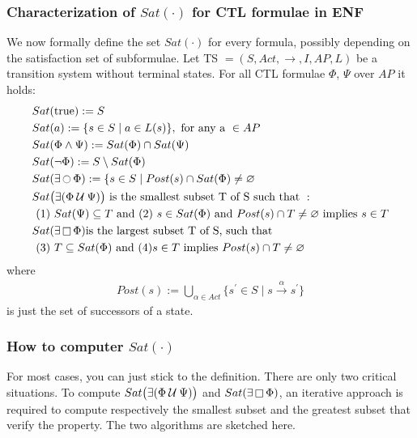 \documentclass{article}
\begin{document}
\subsubsection*{Characterization of $Sat(\cdot)$ for CTL formulae in ENF}
We now formally define the set $Sat(\cdot)$ for every formula, possibly depending on the satisfaction set of subformulae. Let TS $ = (S, Act, \rightarrow, I, AP, L)$ be a transition system without terminal states. For all CTL formulae $\Phi$, $\Psi$ over $AP$ it holds:
\begin{align*}
    & Sat(\text{true}) := S \\
    & Sat(a) := \{ s \in S \mid a \in L(s) \}, \text{ for any a } \in AP \\ 
    & Sat( \Phi \land \Psi) := Sat(\Phi) \cap Sat(\Psi) \\ 
    & Sat(\neg \Phi) := S \setminus Sat(\Phi) \\ 
    & Sat(\exists \mathop{\ocircle}{\Phi}) := \{ s \in S \mid Post(s) \cap Sat(\Phi) \neq \varnothing \\
    & Sat\big(\exists (\Phi \mathbin{\mathcal{U}} \Psi) \big) \text{ is the smallest subset T of S such that }: \\
    & \text{   (1)   } Sat(\Psi) \subseteq T \text{ and (2) } s \in Sat(\Phi) \text{ and } Post(s) \cap T \neq \varnothing \text{ implies } s \in T \\
    & Sat(\exists \mathop{\square} \Phi) \text{is the largest subset T of S, such that }\\
    & \text{   (3)   } T \subseteq Sat(\Phi) \text{ and } (4) s \in T \text{ implies } Post(s) \cap T \neq \varnothing \\
\end{align*}
where
\begin{align*}
    Post(s) := \bigcup_{\alpha \in Act} \{ s^{'} \in S \mid s \xrightarrow{\alpha} s^{'} \}
\end{align*}
is just the set of successors of a state.

\subsubsection{How to computer $Sat(\cdot)$}
For most cases, you can just stick to the definition. There are only two critical situations.
To compute $Sat\big(\exists (\Phi \mathbin{\mathcal{U}} \Psi) \big)$ and $Sat(\exists \mathop{\square} \Phi)$, an iterative approach is required to compute respectively the smallest subset and the greatest subset that verify the property. The two algorithms are sketched here.
\end{document}
